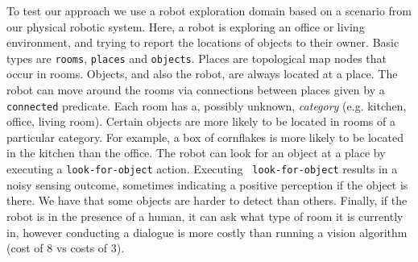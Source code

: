\documentclass{article}
\begin{document}
 

To test our approach we use a robot exploration domain based on a
scenario from our physical robotic system. Here, a robot is exploring
an office or living environment, and trying to report the locations of
objects to their owner. Basic types are {\tt rooms}, {\tt places} and
{\tt objects}. Places are topological map nodes that occur in rooms.
Objects, and also the robot, are always located at a place. The robot
can move around the rooms via connections between places given by a
{\tt connected} predicate. Each room has a, possibly unknown, {\em
  category} (e.g. kitchen, office, living room). Certain objects are
more likely to be located in rooms of a particular category.  For
example, a box of cornflakes is more likely to be located in the
kitchen than the office. The robot can look for an object at a place
by executing a {\tt look-for-object} action. Executing {\tt
  look-for-object} results in a noisy sensing outcome, sometimes
indicating a positive perception if the object is there. We have that
some objects are harder to detect than others. Finally, if the robot
is in the presence of a human, it can ask what type of room it is
currently in, however conducting a dialogue is more costly than
running a vision algorithm (cost of 8 vs costs of 3).

\end{document}
